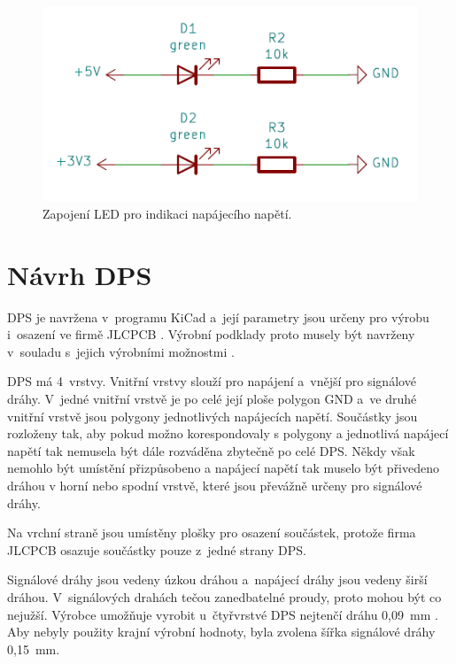   \begin{figure}[!h]
    \begin{center}
      \includegraphics[scale=0.6]{obrazky/powerLED.png}
    \end{center}
    \caption[Zapojení LED pro indikaci napájecího napětí]{Zapojení LED pro indikaci napájecího napětí.}
  \end{figure}

  \chapter{Návrh DPS}
  DPS je navržena v~programu KiCad a~její parametry jsou určeny pro výrobu i~osazení ve firmě JLCPCB \cite{KiCad} \cite{JLCPCB}. Výrobní 
  podklady proto musely být navrženy v~souladu s~jejich výrobními možnostmi \cite{JLCPCB_Capabilities}.

  DPS má 4~vrstvy. Vnitřní vrstvy slouží pro napájení a~vnější pro signálové dráhy. V~jedné vnitřní vrstvě je po celé její ploše 
  polygon GND a~ve druhé vnitřní vrstvě jsou polygony jednotlivých napájecích napětí. Součástky jsou rozloženy tak, aby pokud možno
  korespondovaly s polygony a jednotlivá napájecí napětí tak nemusela být dále rozváděna zbytečně po celé DPS. Někdy však nemohlo být umístění 
  přizpůsobeno a napájecí napětí tak muselo být přivedeno dráhou v horní nebo spodní vrstvě, které jsou převážně určeny pro signálové 
  dráhy. 

  Na vrchní straně jsou umístěny plošky pro osazení součástek, protože firma JLCPCB osazuje součástky pouze z~jedné strany DPS.

  Signálové dráhy jsou vedeny úzkou dráhou a~napájecí dráhy jsou vedeny širší dráhou. V~signálových drahách tečou zanedbatelné 
  proudy, proto mohou být co nejužší. Výrobce umožňuje vyrobit u~čtyřvrstvé DPS nejtenčí dráhu 0,09~mm \cite{JLCPCB_Capabilities}. 
  Aby nebyly použity krajní výrobní hodnoty, byla zvolena šířka signálové dráhy 0,15~mm.

